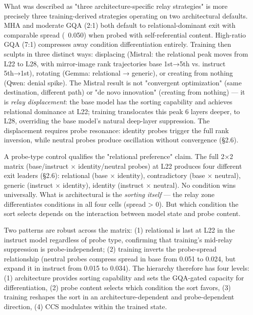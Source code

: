 \documentclass[12pt]{article}
\begin{document}
What was described as "three architecture-specific relay strategies" is more precisely three training-derived strategies operating on two architectural defaults. MHA and moderate GQA (2:1) both default to relational-dominant exit with comparable spread (~0.050) when probed with self-referential content. High-ratio GQA (7:1) compresses away condition differentiation entirely. Training then sculpts in three distinct ways: displacing (Mistral: the relational peak moves from L22 to L28, with mirror-image rank trajectories base 1st→5th vs. instruct 5th→1st), rotating (Gemma: relational → generic), or creating from nothing (Qwen: denial spike). The Mistral result is not "convergent optimization" (same destination, different path) or "de novo innovation" (creating from nothing) — it is \textit{relay displacement}: the base model has the sorting capability and achieves relational dominance at L22; training translocates this peak 6 layers deeper, to L28, overriding the base model's natural deep-layer suppression. The displacement requires probe resonance: identity probes trigger the full rank inversion, while neutral probes produce oscillation without convergence (§2.6).

A probe-type control qualifies the "relational preference" claim. The full 2×2 matrix (base/instruct × identity/neutral probes) at L22 produces four different exit leaders (§2.6): relational (base × identity), contradictory (base × neutral), generic (instruct × identity), identity (instruct × neutral). No condition wins universally. What is architectural is the \textit{sorting itself} — the relay zone differentiates conditions in all four cells (spread > 0). But which condition the sort selects depends on the interaction between model state and probe content.

Two patterns are robust across the matrix: (1) relational is last at L22 in the instruct model regardless of probe type, confirming that training's mid-relay suppression is probe-independent; (2) training inverts the probe-spread relationship (neutral probes compress spread in base from 0.051 to 0.024, but expand it in instruct from 0.015 to 0.034). The hierarchy therefore has four levels: (1) architecture provides sorting capability and sets the GQA-gated capacity for differentiation, (2) probe content selects which condition the sort favors, (3) training reshapes the sort in an architecture-dependent and probe-dependent direction, (4) CCS modulates within the trained state.
\end{document}
